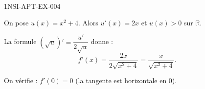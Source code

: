 \begin{corrige}{1NSI-APT-EX-004}

On pose $u(x) = x^2+4$. Alors $u'(x) = 2x$ et $u(x) > 0$ sur $\mathbb{R}$.


La formule $(\sqrt{u})' = \dfrac{u'}{2\sqrt{u}}$ donne :
\[ f'(x) = \frac{2x}{2\sqrt{x^2+4}} = \frac{x}{\sqrt{x^2+4}}. \]

On vérifie : $f'(0) = 0$ (la tangente est horizontale en $0$).

\end{corrige}
